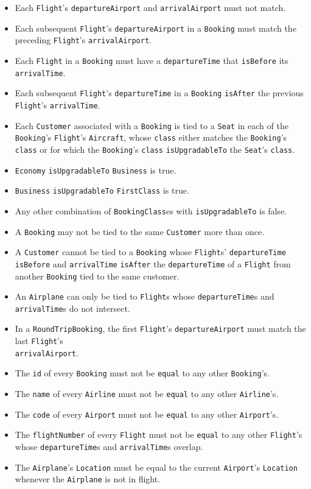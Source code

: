 \documentclass[12pt,a4paper,titlepage]{article}
\def\code#1{\texttt{#1}}
\begin{document}
\begin{itemize}
\item Each \code{Flight}'s \code{departureAirport} and \code{arrivalAirport} must not match.
\item Each subsequent \code{Flight}'s \code{departureAirport} in a \code{Booking} must match the preceding \code{Flight}'s \code{arrivalAirport}.
\item Each \code{Flight} in a \code{Booking} must have a \code{departureTime} that \code{isBefore} its \code{arrivalTime}.
\item Each subsequent \code{Flight}'s \code{departureTime} in a \code{Booking} \code{isAfter} the previous \code{Flight}'s \code{arrivalTime}.
\item Each \code{Customer} associated with a \code{Booking} is tied to a \code{Seat} in each of the \code{Booking}'s \code{Flight}'s \code{Aircraft}, whose \code{class} either matches the \code{Booking}'s \code{class} or for which the \code{Booking}'s \code{class} \code{isUpgradableTo} the \code{Seat}'s \code{class}.
\item \code{Economy} \code{isUpgradableTo} \code{Business} is true.
\item \code{Business} \code{isUpgradableTo} \code{FirstClass} is true.
\item Any other combination of \code{BookingClass}es with \code{isUpgradableTo} is false.
\item A \code{Booking} may not be tied to the same \code{Customer} more than once.
\item A \code{Customer} cannot be tied to a \code{Booking} whose \code{Flight}s' \code{departureTime} \code{isBefore} and \code{arrivalTime} \code{isAfter} the \code{departureTime} of a \code{Flight} from another \code{Booking} tied to the same customer.
\item An \code{Airplane} can only be tied to \code{Flight}s whose \code{departureTime}s and \code{arrivalTime}s do not intersect.
\item In a \code{RoundTripBooking}, the first \code{Flight}'s \code{departureAirport} must match the last \code{Flight}'s \\\code{arrivalAirport}.
\item The \code{id} of every \code{Booking} must not be \code{equal} to any other \code{Booking}'s.
\item The \code{name} of every \code{Airline} must not be \code{equal} to any other \code{Airline}'s.
\item The \code{code} of every \code{Airport} must not be \code{equal} to any other \code{Airport}'s.
\item The \code{flightNumber} of every \code{Flight} must not be \code{equal} to any other \code{Flight}'s whose \code{departureTime}s and \code{arrivalTime}s overlap.
\item The \code{Airplane}'s \code{Location} must be equal to the current \code{Airport}'s \code{Location} whenever the \code{Airplane} is not in flight.
\end{itemize}
\end{document}

